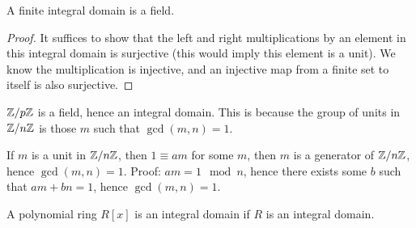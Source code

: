 \begin{prop}
    A finite integral domain is a field.
\end{prop}
\begin{proof}
    It suffices to show that the left and right multiplications by an element in this integral domain is surjective (this would imply this element is a unit). We know the multiplication is injective, and an injective map from a finite set to itself is also surjective.
\end{proof}
\begin{example}
    $\mathbb{Z}/p\mathbb{Z}$ is a field, hence an integral domain. This is because the group of units in $\mathbb{Z}/n\mathbb{Z}$ is those $m$ such that $\gcd(m,n)=1$. 

    If $m$ is a unit in $\mathbb{Z}/n\mathbb{Z}$, then $1\equiv am$ for some $m$, then $m$ is a generator of $\mathbb{Z}/n\mathbb{Z}$, hence $\gcd(m,n)=1$. Proof: $am=1 \mod n$, hence there exists some $b$ such that $am+bn=1$, hence $\gcd(m,n)=1$.
\end{example}
\begin{prop}
    A polynomial ring $R[x]$ is an integral domain if $R$ is an integral domain.
\end{prop}







